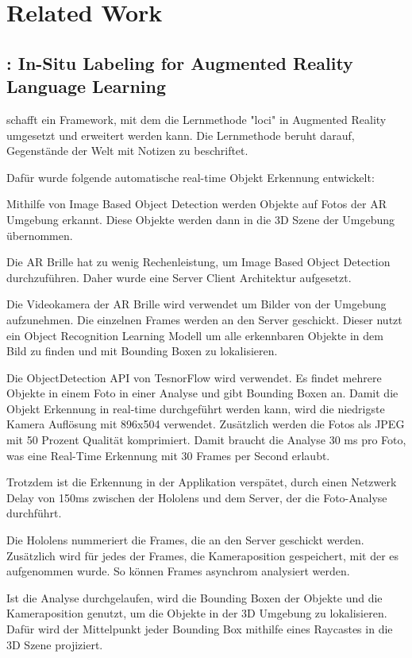 \section{Related Work}

\subsection{\cite{LabelingLanguageLearning}: In-Situ Labeling for Augmented Reality Language Learning}
\cite{LabelingLanguageLearning} schafft ein Framework, mit dem die Lernmethode "loci" in Augmented Reality umgesetzt und erweitert werden kann. Die Lernmethode beruht darauf, Gegenstände der Welt mit Notizen zu beschriftet. 

Dafür wurde folgende automatische real-time Objekt Erkennung entwickelt:

Mithilfe von Image Based Object Detection werden Objekte auf Fotos der AR Umgebung erkannt. Diese Objekte werden dann in die 3D Szene der Umgebung übernommen. 

Die AR Brille hat zu wenig Rechenleistung, um Image Based Object Detection durchzuführen. Daher wurde eine Server Client Architektur aufgesetzt.

Die Videokamera der AR Brille wird verwendet um Bilder von der Umgebung aufzunehmen. Die einzelnen Frames werden an den Server geschickt. Dieser nutzt ein Object Recognition Learning Modell um alle erkennbaren Objekte in dem Bild zu finden und mit Bounding Boxen zu lokalisieren.

Die ObjectDetection API von TesnorFlow wird verwendet. Es findet mehrere Objekte in einem Foto in einer Analyse und gibt Bounding Boxen an. Damit die Objekt Erkennung in real-time durchgeführt werden kann, wird die niedrigste Kamera Auflösung mit 896x504 verwendet. Zusätzlich werden die Fotos als JPEG mit 50 Prozent Qualität komprimiert. Damit braucht die Analyse 30 ms pro Foto, was eine Real-Time Erkennung mit 30 Frames per Second erlaubt. 

Trotzdem ist die Erkennung in der Applikation verspätet, durch einen Netzwerk Delay von 150ms zwischen der Hololens und dem Server, der die Foto-Analyse durchführt.

Die Hololens nummeriert die Frames, die an den Server geschickt werden. Zusätzlich wird für jedes der Frames, die Kameraposition gespeichert, mit der es aufgenommen wurde. So können Frames asynchrom analysiert werden. 

Ist die Analyse durchgelaufen, wird die Bounding Boxen der Objekte und die Kameraposition genutzt, um die Objekte in der 3D Umgebung zu lokalisieren. Dafür wird der Mittelpunkt jeder Bounding Box mithilfe eines Raycastes in die 3D Szene projiziert.

